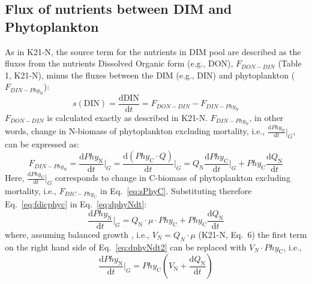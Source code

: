 \documentclass[gmd, manuscript]{copernicus}
\newcommand{\onur}[1]{\textcolor{blue}{\{Onur: #1\}}}
\begin{document}
\subsection{Flux of nutrients between DIM and Phytoplankton}
As in K21-N, the source term for the nutrients in DIM pool are described as the fluxes from the nutrients Dissolved Organic form (e.g., DON), $F_{DON-DIN}$ (Table 1, K21-N), minus the fluxes between the DIM (e.g., DIN) and phytoplankton ($F_{DIN-Phy_\text{N}}$): 
\begin{equation} \label{eq:sdin}
  s(\text{DIN}) = \frac{\text{d}\text{DIN}}{\text{d}t} = F_{DON-DIN} - F_{DIN-Phy_\text{N}}
\end{equation}
$F_{DON-DIN}$ is calculated exactly as described in K21-N. $F_{DIN-Phy_\text{N}}$, in other words, change in N-biomass of phytoplankton excluding mortality, i.e., $\frac{\text{d}Phy_\text{N}}{\text{d}t} \big\rvert_G$, can be expressed as:
\begin{equation} \label{eq:dphyNdt}
  F_{DIN-Phy_\text{N}} = \frac{\text{d}Phy_\text{N}}{\text{d}t} \bigg\rvert_G=\frac{\text{d}(Phy_\text{C} \cdot Q)}{\text{d}t} \bigg\rvert_G = Q_\text{N} \frac{\text{d} Phy_\text{C}}{\text{d} t} \bigg\rvert_G + Phy_\text{C} \frac{\text{d} Q_\text{N}}{\text{d} t} 
\end{equation}
Here, $\frac{\text{d} Phy_\text{C}}{\text{d} t} \big\rvert_G$ corresponds to change in C-biomass of phytoplankton excluding mortality, i.e., $F_{DIC-Phy_\text{C}}$ in Eq.~\ref{eq:sPhyC}. Substituting therefore Eq.~\ref{eq:fdicphyc} in Eq.~\ref{eq:dphyNdt}:
\begin{equation} \label{eq:dphyNdt2}
  \frac{\text{d}Phy_\text{N}}{\text{d}t} \bigg\rvert_G= Q_\text{N} \cdot \mu \cdot Phy_\text{C} + Phy_\text{C} \frac{\text{d} Q_\text{N}}{\text{d} t} 
\end{equation}
where, assuming balanced growth \citep{Burmaster1979}, i.e., $V_N = Q_N \cdot \mu$  (K21-N, Eq.~6) the first term on the right hand side of Eq.~\ref{eq:dphyNdt2} can be replaced with $V_N \cdot Phy_\text{C}$, i.e., 
\begin{equation} \label{eq:dphyNdt3}
  \frac{\text{d}Phy_\text{N}}{\text{d}t} \bigg\rvert_G=  Phy_\text{C} \left( V_\text{N} + \frac{\text{d} Q_\text{N}}{\text{d} t} \right)
\end{equation}

\end{document}
